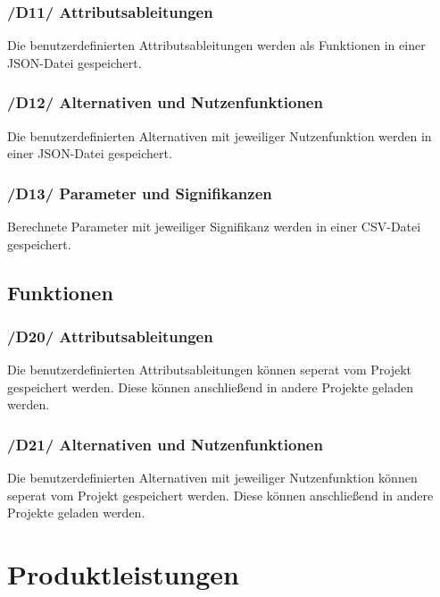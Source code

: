 \documentclass{article}
\begin{document}
\subsubsection*{\textbf{/D11/} Attributsableitungen} \label{sec:dd:Attributsableitungen}
Die benutzerdefinierten Attributsableitungen werden als Funktionen in einer JSON-Datei gespeichert.
\subsubsection*{\textbf{/D12/} Alternativen und Nutzenfunktionen} \label{sec:dd:Alternativen und Nutzenfunktionen}
Die benutzerdefinierten Alternativen mit jeweiliger Nutzenfunktion werden in einer JSON-Datei gespeichert.
\subsubsection*{\textbf{/D13/} Parameter und Signifikanzen} \label{sec:dd:Parameter und Signifikanzen}
Berechnete Parameter mit jeweiliger Signifikanz werden in einer CSV-Datei gespeichert.
\subsection{Funktionen}
\subsubsection*{\textbf{/D20/} Attributsableitungen} \label{sec:df:Attributsableitungen}
Die benutzerdefinierten Attributsableitungen können seperat vom Projekt gespeichert werden. Diese können anschließend in andere Projekte geladen werden.
\subsubsection*{\textbf{/D21/} Alternativen und Nutzenfunktionen} \label{sec:df:Alternativen und Nutzenfunktionen}
Die benutzerdefinierten Alternativen mit jeweiliger Nutzenfunktion können seperat vom Projekt gespeichert werden. Diese können anschließend in andere Projekte geladen werden.


\clearpage
\section{Produktleistungen}
\end{document}
